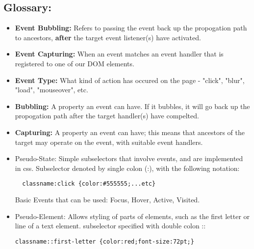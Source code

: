 \documentclass[8pt,a4paper]{extarticle}
\begin{document}
\subsection*{Glossary:}
\begin{itemize}
\item \textbf{Event Bubbling:} Refers to passing the event back up the propogation path to ancestors, \textbf{after} the target event listener(s) have activated.
\item \textbf{Event Capturing:} When an event matches an event handler that is registered to one of our DOM elements.
\item \textbf{Event Type:} What kind of action has occured on the page - "click", "blur", "load", "mouseover", etc.
\item \textbf{Bubbling:} A property an event can have. If it bubbles, it will go back up the propogation path after the target handler(s) have compelted.
\item \textbf{Capturing:} A property an event can have; this means that ancestors of the target may operate on the event, with suitable event handlers.
\item Pseudo-State: Simple subselectors that involve events, and are implemented in css. Subselector denoted by single colon (:), with the following notation:

\begin{verbatim}
  classname:click {color:#555555;...etc}
\end{verbatim}

Basic Events that can be used: Focus, Hover, Active, Visited.

\item Pseudo-Element: Allows styling of parts of elements, such as the first letter or line of a text element. subselector specified with double colon ::

\begin{verbatim}
classname::first-letter {color:red;font-size:72pt;}
\end{verbatim}
\end{itemize}
\end{document}
